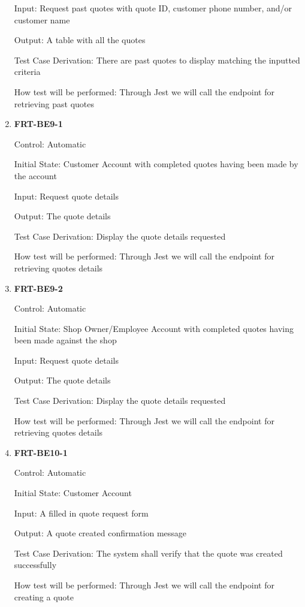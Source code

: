 \documentclass[12pt, titlepage]{article}
\begin{document}
\begin{enumerate}
	      Input: Request past quotes with quote ID, customer phone number, and/or customer name

	      Output: A table with all the quotes

	      Test Case Derivation: There are past quotes to display matching the inputted criteria

	      How test will be performed: Through Jest we will call the endpoint for retrieving past quotes

	\item \textbf{FRT-BE9-1}

	      Control: Automatic

	      Initial State: Customer Account with completed quotes having been made by the account

	      Input: Request quote details

	      Output: The quote details

	      Test Case Derivation: Display the quote details requested

	      How test will be performed: Through Jest we will call the endpoint for retrieving quotes details

	\item \textbf{FRT-BE9-2}

	      Control: Automatic

	      Initial State: Shop Owner/Employee Account with completed quotes having been made against the shop

	      Input: Request quote details

	      Output: The quote details

	      Test Case Derivation: Display the quote details requested

	      How test will be performed: Through Jest we will call the endpoint for retrieving quotes details

	\item \textbf{FRT-BE10-1}

	      Control: Automatic

	      Initial State: Customer Account

	      Input: A filled in quote request form

	      Output: A quote created confirmation message

	      Test Case Derivation: The system shall verify that the quote was created successfully

	      How test will be performed: Through Jest we will call the endpoint for creating a quote


\end{enumerate}
\end{document}
